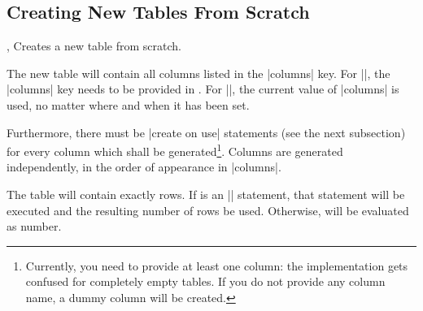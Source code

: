 \subsection{Creating New Tables From Scratch}
\begin{commandlist}{%
	\pgfplotstablenew{},%
	\pgfplotstablenew*{}}
	Creates a new table from scratch. 

	The new table will contain all columns listed in the |columns| key. For |\pgfplotstablenew|, the |columns| key needs to be provided in . For |\pgfplotstablenew*|, the current value of |columns| is used, no matter where and when it has been set.
	

	Furthermore, there must be |create on use| statements (see the next subsection) for every
	column which shall be generated\footnote{Currently, you need to provide at least one column: the implementation gets confused for completely empty tables. If you do not provide any column name, a dummy column will be created.}. Columns are generated
	independently, in the order of appearance in |columns|.

	The table will contain exactly  rows. If  is an |\pgfplotstablegetrowsof| statement, that statement will be executed and the resulting number of rows be  used. Otherwise,  will be evaluated as number.
\begin{codeexample}[]
\table
\pgfplotstabletypeset[empty cells with={---}]\table
\end{codeexample}

\begin{codeexample}[]
	\table
\pgfplotstabletypeset\table
\end{codeexample}
\end{commandlist}

